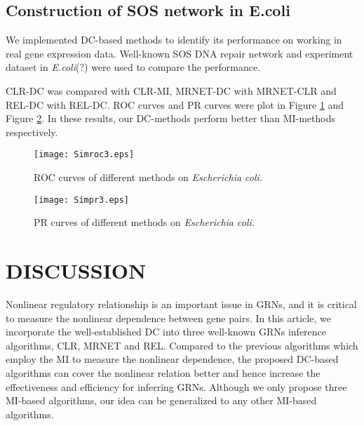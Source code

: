 \documentclass{bioinfo}
\begin{document}
\subsection{Construction of SOS network in E.coli}
We implemented DC-based methods to identify its performance on
working in real gene expression data. Well-known SOS DNA repair
network and experiment dataset in \emph{E.coli}(?) were used to
compare the performance.

CLR-DC was compared with CLR-MI, MRNET-DC with MRNET-CLR and REL-DC
with REL-DC. ROC curves and PR curves were plot in Figure
\ref{roc-sos} and Figure \ref{pr-sos}. In these results, our
DC-methods perform better than MI-methods respectively.

\begin{figure}[!h]
  \texttt{[image: Simroc3.eps]}
  \caption{ROC curves of different methods on \emph{Escherichia coli.}}\label{roc-sos}
\end{figure}

\begin{figure}[!h]
  \texttt{[image: Simpr3.eps]}
  \caption{PR curves of different methods on \emph{Escherichia coli.}}\label{pr-sos}
\end{figure}




\section{DISCUSSION}

Nonlinear regulatory relationship is an important issue in GRNs, and
it is critical to measure the nonlinear dependence between gene
pairs. In this article, we incorporate the well-established DC into
three well-known GRNs inference algorithms, CLR, MRNET and REL.
Compared to the previous algorithms which employ the MI to measure
the nonlinear dependence, the proposed DC-based algorithms can cover
the nonlinear relation better and hence increase the effectiveness
and efficiency for inferring GRNs. Although we only propose three
MI-based algorithms, our idea can be generalized to any other
MI-based algorithms.
\end{document}
